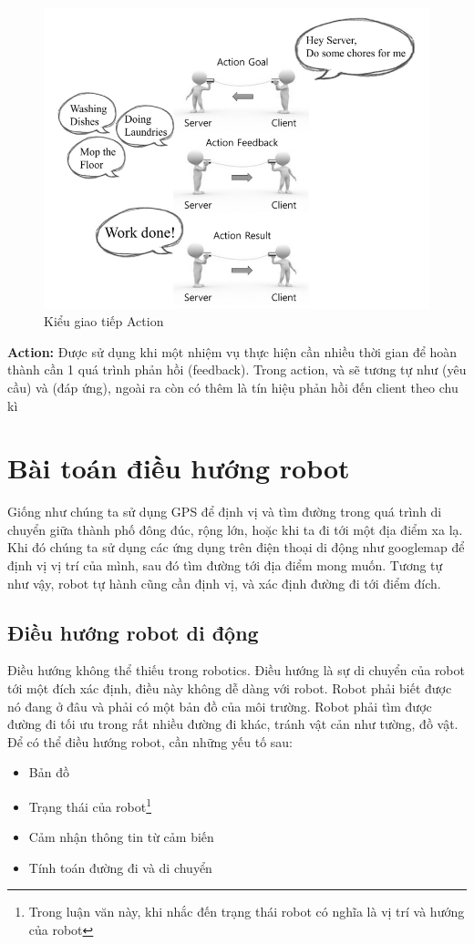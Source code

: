 \begin{figure}[htbp]
  \centering
  \includegraphics[width=0.8\linewidth]{figures/action.png}
  \caption{Kiểu giao tiếp Action}
  \label{fig:action}
\end{figure}
\textbf{Action:} Được sử dụng khi một nhiệm vụ thực hiện cần nhiều thời gian để hoàn thành cần 1 quá trình phản hồi (feedback). Trong action,  và  sẽ tương tự như  (yêu cầu) và (đáp ứng), ngoài ra còn có thêm  là tín hiệu phản hồi đến client theo chu kì


\section{Bài toán điều hướng robot }


  Giống như chúng ta sử dụng GPS để định vị và tìm đường trong quá trình di chuyển giữa thành phố đông đúc, rộng lớn, hoặc khi ta đi tới một địa điểm xa lạ. Khi đó chúng ta sử dụng các ứng dụng trên điện thoại di động như googlemap để định vị vị trí của mình, sau đó tìm đường tới địa điểm mong muốn. Tương tự như vậy, robot tự hành cũng cần định vị, và xác định đường đi tới điểm đích.

\subsection{Điều hướng robot di động}

Điều hướng không thể thiếu trong robotics. Điều hướng là sự di chuyển của robot tới một đích xác định, điều này không dễ dàng với robot. Robot phải biết được nó đang ở đâu và phải có một bản đồ của môi trường. Robot phải tìm được đường đi tối ưu trong rất nhiều đường đi khác, tránh vật cản như tường, đồ vật. Để có thể điều hướng robot, cần những yếu tố sau:
\begin{itemize}
  \item Bản đồ
  \item Trạng thái của robot\footnote{Trong luận văn này, khi nhắc đến trạng thái robot có nghĩa là vị trí và hướng của robot}
  \item Cảm nhận thông tin từ cảm biến
  \item Tính toán đường đi và di chuyển
\end{itemize}

